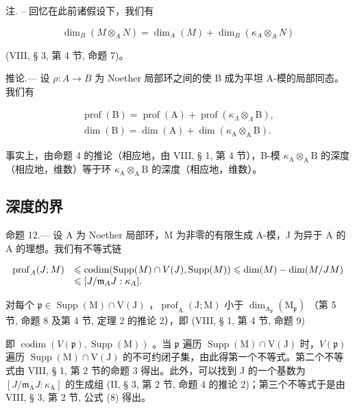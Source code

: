 注. -- 回忆在此前诸假设下，我们有

\[
\dim_ {B} (M \otimes_ {A} N) = \dim_ {A} (M) + \dim_ {B} (\kappa_ {A} \otimes_ {A} N)
\]

(VIII, § 3, 第 4 节, 命题 7)。

推论.--- 设 \(\rho: A \to B\) 为 Noether 局部环之间的使 B 成为平坦 A-模的局部同态。我们有

\[
\begin{array}{l} \operatorname{prof} (\mathrm{B}) = \operatorname{prof} (\mathrm{A}) + \operatorname{prof} \left(\kappa_ {\Lambda} \otimes_ {\Lambda} \mathrm{B}\right), \\ \dim (\mathrm{B}) = \dim (\mathrm{A}) + \dim \left(\kappa_ {\mathrm{A}} \otimes_ {\mathrm{A}} \mathrm{B}\right). \end{array}
\]

事实上，由命题 4 的推论（相应地，由 VIII, § 1, 第 4 节），B-模 \(\kappa_{\mathrm{A}}\otimes_{\mathrm{A}}\mathrm{B}\) 的深度（相应地，维数）等于环 \(\kappa_{\mathrm{A}}\otimes_{\mathrm{A}}\mathrm{B}\) 的深度（相应地，维数）。

\subsection{深度的界}

命题 12.--- 设 A 为 Noether 局部环，M 为非零的有限生成 A-模，J 为异于 A 的 A 的理想。我们有不等式链

\[
\begin{array}{r l} \operatorname{prof} _ {A} (J; M) & \leqslant \operatorname{codim} (\operatorname{Supp} (M) \cap V (J), \operatorname{Supp} (M)) \leqslant \dim (M) - \dim (M / J M) \\ & \leqslant [ J / \mathfrak {m} _ {A} J: \kappa_ {A} ]. \end{array}
\]

对每个 \(\mathfrak{p} \in \operatorname{Supp}(\mathrm{M})\cap \mathrm{V}(\mathrm{J})\) ，\(\operatorname{prof}_{\mathrm{A}}(\mathrm{J};\mathrm{M})\) 小于 \(\dim_{\mathrm{A}_{\mathfrak{p}}}(\mathrm{M}_{\mathfrak{p}})\) （第 5 节, 命题 8 及第 4 节, 定理 2 的推论 2），即 (VIII, § 1, 第 4 节, 命题 9)

即 \(\operatorname{codim}(V(\mathfrak{p}),\operatorname{Supp}(\mathrm{M}))\) 。当 \(\mathfrak{p}\) 遍历 \(\operatorname{Supp}(\mathrm{M}) \cap \mathrm{V}(\mathrm{J})\) 时，\(V(\mathfrak{p})\) 遍历 \(\operatorname{Supp}(\mathrm{M}) \cap \mathrm{V}(\mathrm{J})\) 的不可约闭子集，由此得第一个不等式。第二个不等式由 VIII, § 1, 第 2 节的命题 3 得出。此外，可以找到 J 的一个基数为 \([J/\mathfrak{m}_{\mathrm{A}}J:\kappa_{\mathrm{A}}]\) 的生成组 (II, § 3, 第 2 节, 命题 4 的推论 2)；第三个不等式于是由 VIII, § 3, 第 2 节, 公式 (8) 得出。

